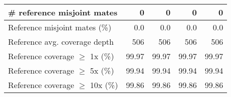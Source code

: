 \documentclass[12pt,a4paper]{article}
\begin{document}
\begin{table}[ht]
\begin{center}
\begin{tabular}{|l*{4}{|r}|}
\# reference misjoint mates & 0 & 0 & 0 & 0 \\ \hline
Reference misjoint mates (\%) & 0.0 & 0.0 & 0.0 & 0.0 \\ \hline
Reference avg. coverage depth & 506 & 506 & 506 & 506 \\ \hline
Reference coverage $\geq$ 1x (\%) & 99.97 & 99.97 & 99.97 & 99.97 \\ \hline
Reference coverage $\geq$ 5x (\%) & 99.94 & 99.94 & 99.94 & 99.94 \\ \hline
Reference coverage $\geq$ 10x (\%) & 99.86 & 99.86 & 99.86 & 99.86 \\ \hline
\end{tabular}
\end{center}
\end{table}
\end{document}
